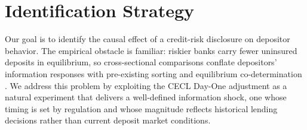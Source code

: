 
\section{Identification Strategy}
\label{sec:identification}

Our goal is to identify the causal effect of a credit-risk disclosure on
depositor behavior.  The empirical obstacle is familiar: riskier banks
carry fewer uninsured deposits in equilibrium, so cross-sectional comparisons
conflate depositors' information responses with pre-existing sorting and
equilibrium co-determination \citep{covitz2004market, chen2022bank}.
We address this problem by exploiting the CECL Day-One adjustment as a
natural experiment that delivers a well-defined information shock, one whose
timing is set by regulation and whose magnitude reflects historical lending
decisions rather than current deposit market conditions.  

